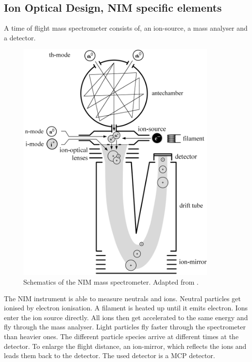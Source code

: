 	
	\subsection{Ion Optical Design, NIM specific elements} %
	
	A time of flight mass spectrometer consists of, an ion-source, a mass analyser and a detector.\\
	
	\begin{figure}[htb] %
		\centering
		\includegraphics[width= 10cm]{Bilder/NIM_Sketch.png} %
		\caption{Schematics of the NIM mass spectrometer. Adapted from \cite{Diss_Meyer}.}
		\label{fig:NIMSketch}
	\end{figure}

	The NIM instrument is able to measure neutrals and ions. Neutral particles get ionised by electron ionisation. A filament is heated up until it emits electron. Ions enter the ion source directly.  %
	All ions then get accelerated to the same energy and fly through the mass analyser. Light particles fly faster through the spectrometer than heavier ones. The different particle species arrive at different times at the detector. To enlarge the flight distance, an ion-mirror, which reflects the ions and leads them back to the detector. The used detector is a MCP detector. %
	
